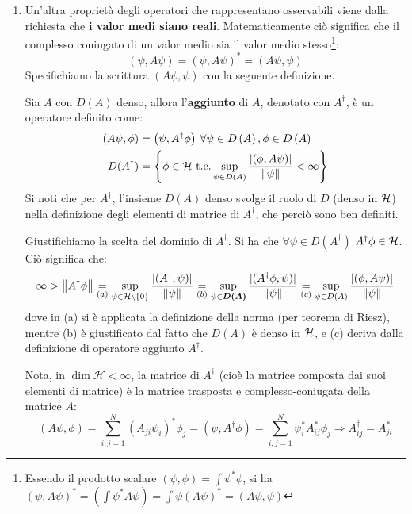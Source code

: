 \documentclass[FisicaTeorica.tex]{subfiles}
\begin{document}
\begin{enumerate}
\item	Un'altra proprietà degli operatori che rappresentano osservabili viene dalla richiesta che \textbf{i valor medi siano reali}. Matematicamente ciò significa che il complesso coniugato di un valor medio sia il valor medio stesso\footnote{Essendo il prodotto scalare $(\psi, \phi) = \int \psi^* \phi$, si ha $(\psi, A\psi)^* = \left (\int \psi^* A\psi\right ) = \int \psi (A\psi)^* = (A\psi, \psi)$}:
	\[
	\left(\psi,A\psi\right)=\left(\psi,A\psi\right)^*=\left(A\psi,\psi\right)
	\]
	Specifichiamo la scrittura $(A\psi, \psi)$ con la seguente definizione.
	\begin{dfn}
	Sia $A$ con $D(A)$ denso, allora l'\textbf{aggiunto} di $A$, denotato con $A^\dag$, è un operatore definito come:
	\begin{align*}
	\left(A\psi,\phi\right)&=\left(\psi,A^\dag\phi\right)\> \forall \psi \in D\left(A\right), \phi \in D\left(A\right)\\
	D(A^\dag) &= \left \{\phi \in \mathcal{H} \text{ t.c.} \sup_{\psi \in D(A)} \frac{|(\phi, A\psi)|}{\left\lVert\psi\right\rVert}< \infty \right \}
	\end{align*}
	Si noti che per $A^\dag$, l'insieme $D(A)$ denso svolge il ruolo di $D$ (denso in $\mathcal{H}$) nella definizione degli elementi di matrice di $A^\dag$, che perciò sono ben definiti.
	\end{dfn}
	\begin{mdframed}[hidealllines=true,backgroundcolor=blue!10,innerleftmargin=3pt,innerrightmargin=3pt,leftmargin=-3pt,rightmargin=-3pt]
	Giustifichiamo la scelta del dominio di $A^\dag$. Si ha che $\forall \psi \in D(A^\dag)$ $A^\dag \phi \in \mathcal{H}$. Ciò significa che:
	\[
	\infty > \left\lVert A^\dag \phi\right\rVert \underset{(a)}{=} \sup_{\psi \in \mathcal{H}\setminus \{0\}} \frac{|(A^\dag,\psi)|}{\left\lVert\psi\right\rVert} \underset{(b)}{=} \sup_{\psi \in \bm{D(A)}} \frac{|(A^\dag\phi, \psi)|}{\left\lVert\psi\right\rVert} \underset{(c)}{=} \sup_{\psi \in D(A)} \frac{|(\phi,A\psi)|}{\left\lVert\psi\right\rVert}
	\]
	dove in (a) si è applicata la definizione della norma (per teorema di Riesz), mentre (b) è giustificato dal fatto che $D(A)$ è denso in $\mathcal{H}$, e (c) deriva dalla definizione di operatore aggiunto $A^\dag$.
	\end{mdframed}
	Nota, in $\dim{\mathcal{H}<\infty}$, la matrice di $A^\dag$ (cioè la matrice composta dai suoi elementi di matrice) è la matrice trasposta e complesso-coniugata della matrice $A$:
	\[
	\left(A\psi,\phi\right)=\sum_{i,j=1}^{N}{\left(A_{ji}\psi_i\right)^*\phi_j=\left(\psi,A^\dag\phi\right)=\sum_{i,j=1}^{N}{\psi_i^* A_{ij}^*\phi_j}\Rightarrow A_{ij}^\dag=A_{ji}^*}
\]
\end{enumerate}
\end{document}
